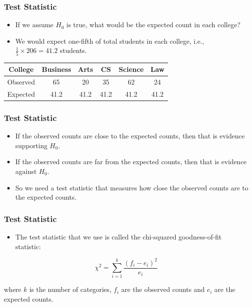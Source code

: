 \documentclass[12pt]{beamer}
\begin{document}
		\begin{frame}
			\frametitle{Test Statistic}
			
			\begin{itemize}[label={\color{blue}$\blacktriangleright$}]
				\item If we assume $H_0$ is true, what would be the expected count in each college?
				\item We would expect one-fifth of total students in each college, i.e., $\frac{1}{5} \times 206 = 41.2$ students.
			\end{itemize}
			
			\medskip
			
			\begin{center}
				\begin{tabular}{cccccc}
				\toprule
				College & Business & Arts & CS & Science & Law \\
				\midrule
				Observed & 65 & 20 & 35 & 62 & 24 \\
				Expected & 41.2 & 41.2 & 41.2 & 41.2 & 41.2 \\
				\bottomrule
			\end{tabular}
			\end{center}
			
		\end{frame}
		\begin{frame}
			\frametitle{Test Statistic}
			
			\begin{itemize}[label={\color{blue}$\blacktriangleright$}]
				\item If the observed counts are close to the expected counts, then that is evidence supporting $H_0$.
				
				\item If the observed counts are far from the expected counts, then that is evidence against $H_0$.
				
				\item So we need a test statistic that measures how close the observed counts are to the expected counts.
			\end{itemize}
			
		\end{frame}
		\begin{frame}
			\frametitle{Test Statistic}
			
			\begin{itemize}[label={\color{blue}$\blacktriangleright$}]
				\item The test statistic that we use is called the chi-squared goodness-of-fit statistic:
			\end{itemize}
			
			\medskip
			
			\[
			\chi^2 = \sum_{i=1}^k \frac{(f_i - e_i)^2}{e_i}
			\]
			
			\medskip
			
			where $k$ is the number of categories, $f_i$ are the observed counts and $e_i$ are the expected counts.
			
		\end{frame}
\end{document}
